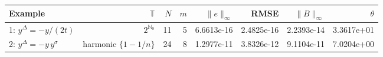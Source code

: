 \begin{tabular}{lrrrrrrr}
\toprule
Example & $\mathbb{T}$ & $N$ & $m$ & $\|e\|_\infty$ & RMSE & $\|B\|_\infty$ & $\theta$ \\
\midrule
1: $y^{\Delta}=-y/(2t)$ & $2^{\mathbb{N}_0}$ & 11 & 5 & 6.6613e-16 & 2.4825e-16 & 2.2393e-14 & 3.3617e+01 \\
2: $y^{\Delta}=-y\,y^{\sigma}$ & harmonic $\{1-1/n\}$ & 24 & 8 & 1.2977e-11 & 3.8326e-12 & 9.1104e-11 & 7.0204e+00 \\
\bottomrule
\end{tabular}
